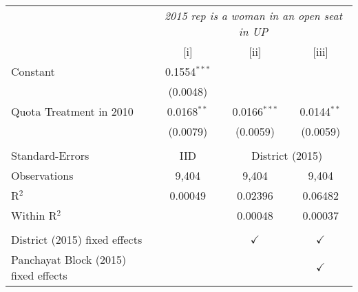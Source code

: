 
\begingroup
\centering
\begin{tabular}{lccc}
   \toprule
    & \multicolumn{3}{c}{\textit{2015 rep is a woman in an open seat in UP}}\\
                                        & [i]            & [ii]           & [iii]\\  
   \midrule 
   Constant                             & 0.1554$^{***}$ &                &   \\   
                                        & (0.0048)       &                &   \\   
   Quota Treatment in 2010              & 0.0168$^{**}$  & 0.0166$^{***}$ & 0.0144$^{**}$\\   
                                        & (0.0079)       & (0.0059)       & (0.0059)\\   
    \\
   Standard-Errors & IID & \multicolumn{2}{c}{District (2015)} \\ 
   Observations                         & 9,404          & 9,404          & 9,404\\  
   R$^2$                                & 0.00049        & 0.02396        & 0.06482\\  
   Within R$^2$                         &                & 0.00048        & 0.00037\\  
    \\
   District (2015) fixed effects        &                & $\checkmark$   & $\checkmark$\\   
   Panchayat Block (2015) fixed effects &                &                & $\checkmark$\\   
   \bottomrule
\end{tabular}
\par\endgroup


